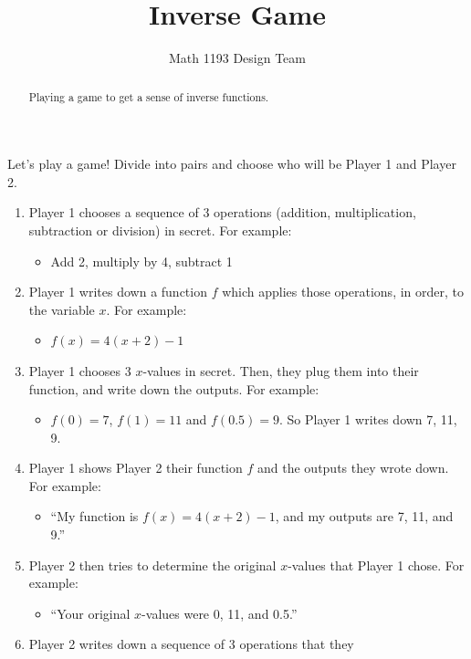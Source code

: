 \documentclass[noauthor]{ximera}
\title{Inverse Game}
\author{Math 1193 Design Team}
\begin{document}
\begin{abstract}
    Playing a game to get a sense of inverse functions.
\end{abstract}
\maketitle

Let's play a game! Divide into pairs and choose who will be
Player 1 and Player 2. 

\begin{enumerate}
    \item Player 1 chooses a sequence of 3 operations (addition, 
    multiplication, subtraction or division) in secret. For example:
    \begin{itemize}
        \item Add 2, multiply by 4, subtract 1
    \end{itemize}
    \item Player 1 writes down a function \(f\) which applies those operations,
    in order, to the variable \(x\). For example:
    \begin{itemize}
        \item \(f(x) = 4(x + 2) - 1\)
    \end{itemize}
    \item Player 1 chooses 3 \(x\)-values in secret. Then, they plug them into their function,
    and write down the outputs. For example:
    \begin{itemize}
        \item \(f(0) = 7\), \(f(1) = 11\) and \(f(0.5) = 9\). So Player 1
        writes down 7, 11, 9.
    \end{itemize}
    \item Player 1 shows Player 2 their function \(f\) and the outputs they wrote down.
    For example:
    \begin{itemize}
        \item ``My function is \(f(x) = 4(x + 2) - 1\), and my outputs are 7, 11, and 9.''
    \end{itemize}
    \item Player 2 then tries to determine the original \(x\)-values that
    Player 1 chose. For example:
    \begin{itemize}
        \item ``Your original \(x\)-values were 0, 11, and 0.5.''
    \end{itemize}
    \item Player 2 writes down a sequence of 3 operations that they

\end{enumerate}
\end{document}
